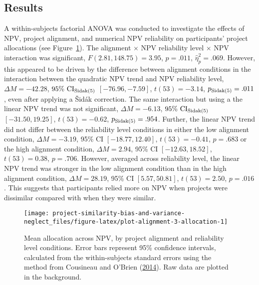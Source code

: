 \documentclass[
  english,
  man, donotrepeattitle,floatsintext]{apa7}
\theoremstyle{definition}
\theoremstyle{definition}
\theoremstyle{definition}
\theoremstyle{definition}
\theoremstyle{remark}
\begin{document}
\hypertarget{results-alignment-2}{%
\subsection{Results}\label{results-alignment-2}}

A within-subjects factorial ANOVA was conducted to investigate the effects of
NPV, project alignment, and numerical NPV reliability on participants' project
allocations (see Figure~\ref{fig:plot-alignment-3-allocation}). The alignment
\(\times\) NPV reliability level \(\times\) NPV interaction was significant,
\(F(2.81, 148.75) = 3.95\), \(p = .011\), \(\hat{\eta}^2_p = .069\).
However, this appeared to be driven by the difference between alignment
conditions in the interaction between the quadratic NPV trend and NPV
reliability level,
\(\Delta M = -42.28\), \(95\%\ \mathrm{CI}_\mathrm{\scriptsize Sidak(5)}\) \([-76.96, -7.59]\), \(t(53) = -3.14\), \(p_\mathrm{\scriptsize Sidak(5)} = .011\), even after
applying a \v{S}idák correction. The same interaction but using a the linear NPV
trend was not significant,
\(\Delta M = -6.13\), \(95\%\ \mathrm{CI}_\mathrm{\scriptsize Sidak(5)}\) \([-31.50, 19.25]\), \(t(53) = -0.62\), \(p_\mathrm{\scriptsize Sidak(5)} = .954\). Further, the linear
NPV trend did not differ between the reliability level conditions in either the
low alignment condition, \(\Delta M = -3.19\), 95\% CI \([-18.77, 12.40]\), \(t(53) = -0.41\), \(p = .683\)
or the high alignment condition,
\(\Delta M = 2.94\), 95\% CI \([-12.63, 18.52]\), \(t(53) = 0.38\), \(p = .706\). However, averaged
across reliability level, the linear NPV trend was stronger in the low alignment
condition than in the high alignment condition,
\(\Delta M = 28.19\), 95\% CI \([5.57, 50.81]\), \(t(53) = 2.50\), \(p = .016\). This suggests that
participants relied more on NPV when projects were dissimilar compared with when
they were similar.



\begin{figure}
\texttt{[image: project-similarity-bias-and-variance-neglect\_files/figure-latex/plot-alignment-3-allocation-1]} \caption{Mean allocation across NPV, by project alignment and reliability level conditions. Error bars represent 95\% confidence intervals, calculated from the within-subjects standard errors using the method from Cousineau and O'Brien (\protect\hyperlink{ref-cousineau2014}{2014}). Raw data are plotted in the background.}\label{fig:plot-alignment-3-allocation}
\end{figure}
\end{document}
